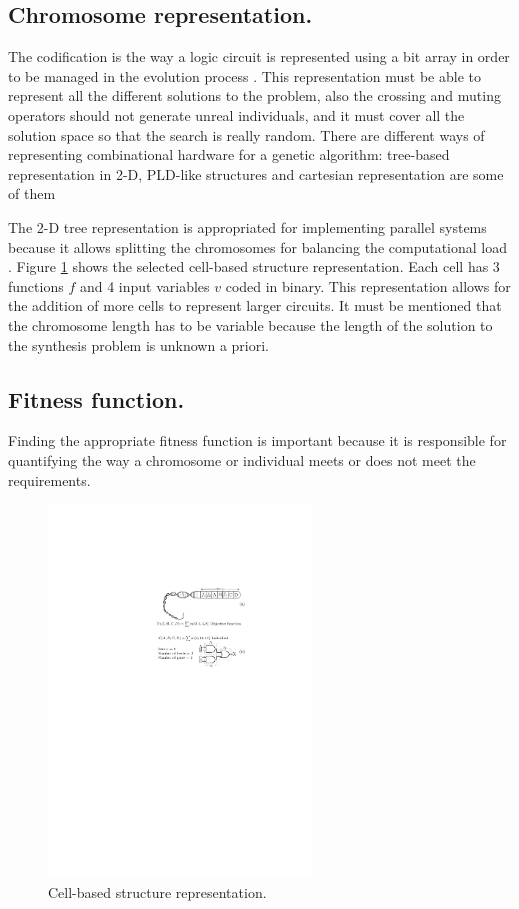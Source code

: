 \documentclass[runningheads,a4paper]{llncs}
\begin{document}
\subsection{Chromosome representation.}
The codification is the way a logic circuit is represented using a bit array in order to be managed in the evolution process \cite{FR06}. This representation must be able to represent all the different solutions to the problem, also the crossing and muting operators should not generate unreal individuals, and it must cover all the solution space so that the search is really random. There are different ways of representing combinational hardware for a genetic algorithm: tree-based representation in 2-D, PLD-like structures and cartesian representation are some of them \cite{JKFB+99} \cite{THTN+92} \cite{JMPT98}

The 2-D tree representation is appropriated for implementing parallel systems because it allows splitting the chromosomes for balancing the computational load \cite{QYCC06}. Figure \ref{fig:cell_structure} shows the selected cell-based structure representation. Each cell has 3 functions $f$ and 4 input variables $v$ coded in binary. This representation allows for the addition of more cells to represent larger circuits. It must be mentioned that the chromosome length has to be variable because the length of the solution to the synthesis problem is unknown a priori. 

\subsection{Fitness function.}
Finding the appropriate fitness function is important because it is responsible for quantifying the way a chromosome or individual meets or does not meet the requirements.


\begin{figure}[htpb]
\begin{center} 
\includegraphics[width=7cm]{./images/fitness} \end{center}
\caption{Cell-based structure representation.}\label{fig:cell_structure}
\end{figure}
\end{document}
